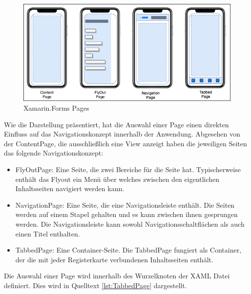 \begin{figure}[h]
 \includegraphics[width=\textwidth,height=\textheight,keepaspectratio]{Images/CrossPlattformFrameworks/XamarinFormsPages.png}
 \caption{Xamarin.Forms Pages}
 \label{fig:Xamarin.Forms Pages}
\end{figure}

Wie die Darstellung präsentiert, hat die Auswahl einer Page einen direkten Einfluss auf das Navigationskonzept innerhalb der Anwendung.  Abgesehen von der ContentPage, die ausschließlich eine View anzeigt haben die jeweiligen Seiten das folgende Navigationskonzept: 

\begin{itemize}
\setlength\itemsep{-0.6em}
 \item FlyOutPage: Eine Seite, die zwei Bereiche für die Seite hat. Typischerweise enthält das Flyout ein Menü über welches zwischen den eigentlichen Inhaltsseiten navigiert werden kann.
 \item NavigationPage: Eine Seite,  die eine Navigationsleiste enthält.  Die Seiten werden auf einem Stapel gehalten und es kann zwischen ihnen gesprungen werden.  Die Navigationsleiste kann sowohl Navigationsschaltflächen als auch einen Titel enthalten.
 \item TabbedPage: Eine Container-Seite.  Die TabbedPage fungiert als Container,  der die mit jeder Registerkarte verbundenen Inhaltsseiten enthält.
\end{itemize}

Die Auswahl einer Page wird innerhalb des Wurzelknoten der XAML Datei definiert.  Dies wird in Quelltext \ref{lst:TabbedPage} dargestellt. 

\begin{minipage}{\linewidth}

\end{minipage}

